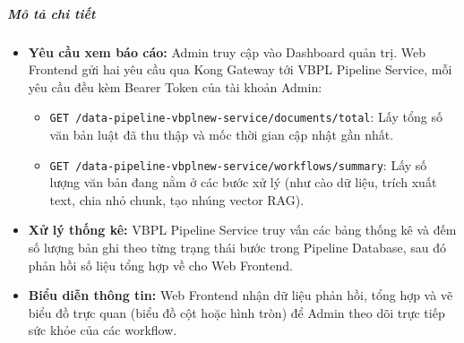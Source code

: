 \subparagraph{Mô tả chi tiết}
\begin{itemize}
\item \textbf{Yêu cầu xem báo cáo:} Admin truy cập vào Dashboard quản trị. Web Frontend gửi hai yêu cầu qua Kong Gateway tới VBPL Pipeline Service, mỗi yêu cầu đều kèm Bearer Token của tài khoản Admin:
    \begin{itemize}
    \item \texttt{GET /data-pipeline-vbplnew-service/documents/total}: Lấy tổng số văn bản luật đã thu thập và mốc thời gian cập nhật gần nhất.
    \item \texttt{GET /data-pipeline-vbplnew-service/workflows/summary}: Lấy số lượng văn bản đang nằm ở các bước xử lý (như cào dữ liệu, trích xuất text, chia nhỏ chunk, tạo nhúng vector RAG).
    \end{itemize}
\item \textbf{Xử lý thống kê:} VBPL Pipeline Service truy vấn các bảng thống kê và đếm số lượng bản ghi theo từng trạng thái bước trong Pipeline Database, sau đó phản hồi số liệu tổng hợp về cho Web Frontend.
\item \textbf{Biểu diễn thông tin:} Web Frontend nhận dữ liệu phản hồi, tổng hợp và vẽ biểu đồ trực quan (biểu đồ cột hoặc hình tròn) để Admin theo dõi trực tiếp sức khỏe của các workflow.
\end{itemize}
